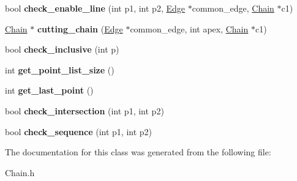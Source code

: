 \begin{DoxyCompactItemize}
bool {\bfseries check\+\_\+enable\+\_\+line} (int p1, int p2, \mbox{\hyperlink{class_edge}{Edge}} $\ast$common\+\_\+edge, \mbox{\hyperlink{class_chain}{Chain}} $\ast$c1)
\item 
\mbox{\label{class_chain_ac8638157db1f0cb44dfa24b498e76e76}} 
\mbox{\hyperlink{class_chain}{Chain}} $\ast$ {\bfseries cutting\+\_\+chain} (\mbox{\hyperlink{class_edge}{Edge}} $\ast$common\+\_\+edge, int apex, \mbox{\hyperlink{class_chain}{Chain}} $\ast$c1)
\item 
\mbox{\label{class_chain_ac3573852a74e0fa8ec512495b2e6e70d}} 
bool {\bfseries check\+\_\+inclusive} (int p)
\item 
\mbox{\label{class_chain_af9c5db782c0b9d548199b35b47b38b0e}} 
int {\bfseries get\+\_\+point\+\_\+list\+\_\+size} ()
\item 
\mbox{\label{class_chain_a4ccef8a42646d48752d8fdab852d0f7a}} 
int {\bfseries get\+\_\+last\+\_\+point} ()
\item 
\mbox{\label{class_chain_aed8b8ff23a657ad2ec0c5cbca074c386}} 
bool {\bfseries check\+\_\+intersection} (int p1, int p2)
\item 
\mbox{\label{class_chain_a0134cb07eaf701aa7a80fbd410ab072a}} 
bool {\bfseries check\+\_\+sequence} (int p1, int p2)
\end{DoxyCompactItemize}


The documentation for this class was generated from the following file\+:\begin{DoxyCompactItemize}
\item 
Chain.\+h\end{DoxyCompactItemize}
